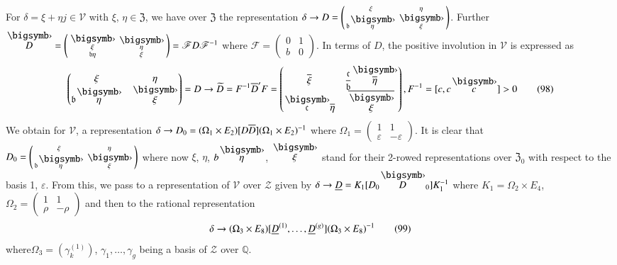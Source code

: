For $\delta=\xi+\eta j\in\mathscr{V}$ with $\xi$,
$\eta\in\mathfrak{Z}$, we have over $\mathfrak{Z}$ the representation
$\delta\to D=\left(\begin{smallmatrix} \xi &
  \eta\\ \mathfrak{b}\overdot{\eta} & \overdot{\xi}
\end{smallmatrix}\right)$. Further
$\overdot{D}=\left(\begin{smallmatrix} \overdot{\xi} &
  \overdot{\eta}\\ \mathfrak{b}\eta &
  \xi\end{smallmatrix}\right)=\mathscr{F}D\mathscr{F}^{-1}$ where
  $\mathscr{F}=\left(\begin{smallmatrix} 0 & 1\\ b & 0
  \end{smallmatrix}\right)$. In terms of $D$, the positive involution
  in $\mathscr{V}$ is expressed as
\begin{equation*}
\begin{pmatrix}
\xi & \eta\\
\mathfrak{b}\overdot{\eta} & \overdot{\xi}
\end{pmatrix}
=D\to\widetilde{D}=F^{-1}\ob{D}'F=
\begin{pmatrix}
\ob{\xi} & \dfrac{\mathfrak{c}}{\mathfrak{b}}\overdot{\ob{\eta}}\\
\overdot{\mathfrak{c}}\ob{\eta} & \ob{\overdot{\xi}}
\end{pmatrix},
F^{-1}=[c,c\overdot{c}]>0\tag{98}\label{eq98}
\end{equation*}
We obtain for $\mathscr{V}$, a representation $\delta\to
D_{0}=(\Omega_{1}\times E_{2})[D\overline{D}](\Omega_{1}\times E_{2})^{-1}$
where $\Omega_{1}=\left(\begin{smallmatrix} 1 & 1\\ \varepsilon &
  -\varepsilon\end{smallmatrix}\right)$. It is clear that
  $D_{0}=\left(\begin{smallmatrix}\xi &
    \eta\\ \mathfrak{b}\overdot{\eta} & \overdot{\xi}
  \end{smallmatrix}\right)$ where now $\xi$, $\eta$,
  $b\overdot{\eta}$, $\overdot{\xi}$ stand for their 2-rowed
  representations over $\mathfrak{Z}_{0}$ with respect to the basis
  1, $\varepsilon$. From this, we pass to a representation of
  $\mathscr{V}$ over $\mathscr{Z}$ given by $\delta\to
  \ub{D}=K_{1}[D_{0}\overdot{D}_{0}]K^{-1}_{1}$ where
  $K_{1}=\Omega_{2}\times E_{4}$,
  $\Omega_{2}=\left(\begin{smallmatrix} 1 & 1\\ \rho & -\rho
  \end{smallmatrix}\right)$ and then to the rational representation
\begin{equation*}
\delta\to (\Omega_{3}\times
E_{8})[\underline{D}^{(1)},\ldots,\underline{D}^{(g)}](\Omega_{3}\times
E_{8})^{-1}\tag{99}\label{eq99} 
\end{equation*}
where\pageoriginale $\Omega_{3}=(\gamma^{(1)}_{k})$,
$\gamma_{1},\ldots,\gamma_{g}$ being a basis of $\mathscr{Z}$ over
$\mathbb{Q}$. 

